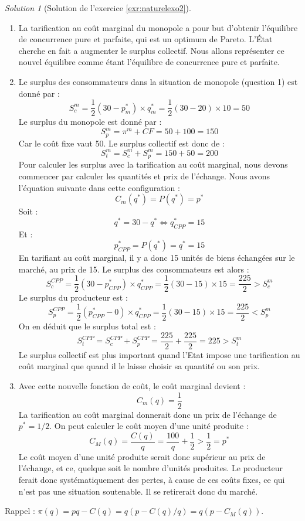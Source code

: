 \documentclass[
]{book}
\theoremstyle{definition}
\theoremstyle{definition}
\theoremstyle{definition}
\theoremstyle{definition}
\theoremstyle{remark}
\newtheorem*{solution}{Solution}
\begin{document}
\begin{solution}[Solution de l'exercice \ref{exr:naturelexo2}]
\begin{enumerate}
\def\labelenumi{\arabic{enumi}.}
\setcounter{enumi}{1}
\item
  La tarification au coût marginal du monopole a pour but d'obtenir l'équilibre de concurrence pure et parfaite, qui est un optimum de Pareto.
  L'État cherche en fait a augmenter le surplus collectif.
  Nous allons représenter ce nouvel équilibre comme étant l'équilibre de concurrence pure et parfaite.
\item
  Le surplus des consommateurs dans la situation de monopole (question 1) est donné par :
  \[S_c^m=\frac{1}{2}(30-p_m^*)\times q_m^*=\frac{1}{2}(30-20)\times 10=50\]
  Le surplus du monopole est donné par :
  \[S_p^m=\pi^m+CF=50+100=150\]
  Car le coût fixe vaut 50.
  Le surplus collectif est donc de :
  \[S_t^m=S_c^m+S_p^m=150+50=200\]
  Pour calculer les surplus avec la tarification au coût marginal, nous devons commencer par calculer les quantités et prix de l'échange.
  Nous avons l'équation suivante dans cette configuration :
  \[C_m(q^*)=P(q^*)=p^*\]
  Soit :
  \[q^*=30-q^*\Leftrightarrow q^*_{CPP}=15\]
  Et :
  \[p^*_{CPP}=P(q^*)=q^*=15\]
  En tarifiant au coût marginal, il y a donc 15 unités de biens échangées sur le marché, au prix de 15.
  Le surplus des consommateurs est alors :
  \[S_c^{CPP}=\frac{1}{2}(30-p_{CPP}^*)\times q_{CPP}^*=\frac{1}{2}(30-15)\times 15=\frac{225}{2}>S_c^m\]
  Le surplus du producteur est :
  \[S_p^{CPP}=\frac{1}{2}(p_{CPP}^*-0)\times q_{CPP}^*=\frac{1}{2}(30-15)\times 15=\frac{225}{2}<S_p^m\]
  On en déduit que le surplus total est :
  \[S_t^{CPP}=S_c^{CPP}+S_p^{CPP}=\frac{225}{2}+\frac{225}{2}=225>S_t^m\]
  Le surplus collectif est plus important quand l'Etat impose une tarification au coût marginal que quand il le laisse choisir sa quantité ou son prix.
\item
  Avec cette nouvelle fonction de coût, le coût marginal devient :
  \[C_m(q)=\frac{1}{2}\]
  La tarification au coût marginal donnerait donc un prix de l'échange de \(p^*=1/2\).
  On peut calculer le coût moyen d'une unité produite :
  \[C_M(q)=\frac{C(q)}{q}=\frac{100}{q}+\frac{1}{2}>\frac{1}{2}=p^*\]
  Le coût moyen d'une unité produite serait donc supérieur au prix de l'échange, et ce, quelque soit le nombre d'unités produites.
  Le producteur ferait donc systématiquement des pertes, à cause de ces coûts fixes, ce qui n'est pas une situation soutenable.
  Il se retirerait donc du marché.
\end{enumerate}

Rappel : \(\pi(q)=pq-C(q)=q(p-C(q)/q)=q(p-C_M(q))\).


\end{solution}
\end{document}

